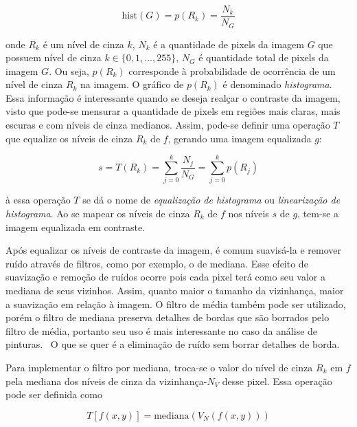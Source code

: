 \begin{equation}
\text{hist}(G) = p(R_k) = \frac{N_k}{N_G}
\end{equation}

\noindent onde $R_k$ é um nível de cinza $k$, $N_k$ é a quantidade de pixels da
imagem $G$ que possuem nível de cinza $k \in \{0, 1, ..., 255\}$, $N_G$ é quantidade total de pixels da
imagem $G$. Ou seja, $p(R_k)$ corresponde à
probabilidade de ocorrência de um nível de cinza $R_k$ na imagem. O gráfico de
$p(R_k)$ é denominado \emph{histograma}. Essa informação é interessante quando
se deseja realçar o contraste da imagem, visto que pode-se mensurar a quantidade
de pixels em regiões mais claras, mais escuras e com níveis de cinza
medianos. Assim, pode-se definir uma operação $T$ que equalize os níveis de
cinza $R_k$ de $f$, gerando uma imagem equalizada $g$:

\begin{equation}
s = T(R_k) = \sum_{j=0}^k \frac{N_j}{N_G} = \sum_{j=0}^k p(R_j)
\end{equation}

\noindent à essa operação $T$ se dá o nome de \emph{equalização de histograma}
ou \emph{linearização de histograma}. Ao se mapear os níveis de cinza $R_k$ de $f$
nos níveis $s$ de $g$, tem-se a imagem equalizada em contraste.


Após equalizar os níveis de contraste da imagem, é comum suavisá-la e remover
ruído através de filtros, como por exemplo, o de mediana. Esse efeito de suavização e
remoção de ruídos ocorre pois cada pixel terá como seu valor a mediana de seus
vizinhos. Assim, quanto maior o tamanho da vizinhança, maior a suavização em
relação à imagem. O filtro de
média também pode ser utilizado, porém o filtro de mediana preserva detalhes
de bordas que são borrados pelo filtro de média, portanto seu uso é mais
interessante no caso da análise de pinturas.~\cite{gonzalez} O que se quer é a eliminação de
ruído sem borrar detalhes de borda.

Para implementar o filtro por mediana, troca-se o valor do nível de cinza $R_k$
em $f$ pela mediana dos níveis de cinza da vizinhança-$N_V$ desse pixel. Essa
operação pode ser definida como

\begin{equation}
  T[f(x,y)] = \text{mediana}(V_N(f(x,y)))
\end{equation}


